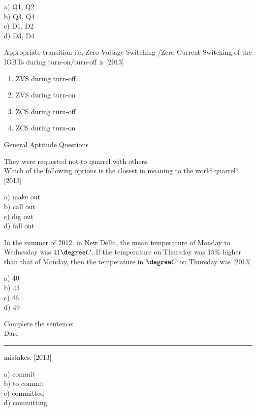  \begin{multicols}{4}
     a) Q1, Q2\\
     b) Q3, Q4\\
     c) D1, D2\\
     d) D3, D4
 \end{multicols}
 
 \item Appropriate transition i.e, Zero Voltage Switching /Zero Current Switching  of the IGBTs during turn-on/turn-off is \hfill{[2013]}
 \begin{enumerate}
     \item ZVS during turn-off\\
     \item ZVS during turn-on\\
     \item ZCS during turn-off\\
     \item ZCS during turn-on
 \end{enumerate}
 General Aptitude  Questions
\item They were requested not to quarrel with others.\\
Which of the following options is the closest in meaning to the world quarrel? 
\hfill{[2013]}
\begin{multicols}{4}
    a) make out\\
    b) call out\\
    c) dig out\\
    d) fall out
\end{multicols}

\item In the summer of 2012, in New Delhi, the mean temperature of Monday to Wednesday was $41\degree C$. If the temperature on Thursday was 15\% higher than that of Monday, then the temperature in $\degree C$ on Thursday was  \hfill{[2013]}
\begin{multicols}{4}
    a) 40\\
    b) 43\\
    c) 46\\
    d) 49
\end{multicols}
\item Complete the sentence:\\
Dare \rule{1in}{0.4pt} mistakes.
\hfill{[2013]}
\begin{multicols}{4}
    a) commit\\
    b) to commit\\
    c) committed\\
    d) committing
\end{multicols}

